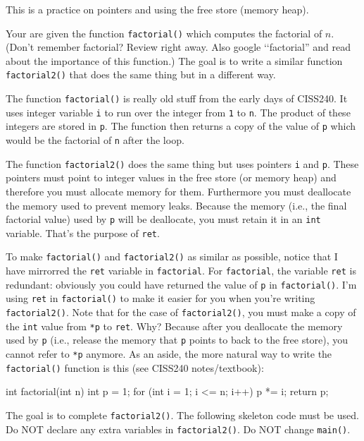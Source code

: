 This is a practice on pointers and using the free store (memory heap).

Your are given the function \verb!factorial()! which computes
the factorial of $n$. 
(Don't remember factorial? Review right away.
Also google \lq\lq factorial'' and read about the importance of
this function.)
The goal is to write a similar function \verb!factorial2()!
that does the same thing but in a different way.

The function \verb!factorial()! is really old stuff from the early days of
CISS240.
It uses integer variable \verb!i!
to run over the integer from \verb!1! to \verb!n!.
The product of these integers are stored in \verb!p!.
The function then returns a copy of the value of
\verb!p! which would be the factorial of \verb!n!
after the loop.

The function \verb!factorial2()! does the same thing but
uses pointers \verb!i! and \verb!p!.
These pointers must point to integer values in the free
store (or memory heap) and therefore you must allocate memory
for them.
Furthermore you must deallocate the memory used to prevent
memory leaks.
Because the memory (i.e., the final factorial value) used by \verb!p!
will be deallocate, you must retain it in an \verb!int!
variable. That's the purpose of \verb!ret!.

To make \verb!factorial()! and \verb!factorial2()! as similar
as possible, notice that I have mirrorred the \verb!ret!
variable in \verb!factorial!. For \verb!factorial!,
the variable \verb!ret! is redundant: obviously you could have
returned the value of \verb!p! in \verb!factorial()!.
I'm using \verb!ret! in \verb!factorial()! to make it easier for you
when you're writing \verb!factorial2()!.
Note that for the case of \verb!factorial2()!, you must
make a copy of the \verb!int! value from \verb!*p! to 
\verb!ret!. 
Why?
Because after you deallocate the memory used by \verb!p!
(i.e., release the memory that \verb!p! points to back to the free store),
you cannot refer to \verb!*p! anymore.
As an aside, the more natural way to write the \verb!factorial()! function
is this (see CISS240 notes/textbook):
\begin{console}
int factorial(int n)
{
    int p = 1;
    for (int i = 1; i <= n; i++)
    {
        p *= i;
    }
    return p;
}
\end{console}

The goal is to complete \verb!factorial2()!.
The following skeleton code must be used.
Do NOT declare any extra variables in \verb!factorial2()!.
Do NOT change \verb!main()!.

